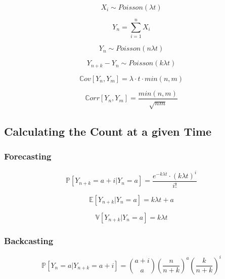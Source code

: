 \begin{equation*}
    X_i \sim Poisson(\lambda t)
\end{equation*}

\begin{equation*}
    Y_n = \sum_{i = 1}^{n} X_i
\end{equation*}

\begin{equation*}
    Y_n \sim Poisson(n \lambda t)
\end{equation*}

\begin{equation*}
    Y_{n+k} - Y_n \sim Poisson(k \lambda t)
\end{equation*}

\begin{equation*}
    \mathbb{C}ov[Y_n, Y_m] = \lambda \cdot t \cdot min(n, m)
\end{equation*}

\begin{equation*}
    \mathbb{C}orr[Y_n, Y_m] = \frac{min(n, m)}{\sqrt{nm}}
\end{equation*}

\subsection{Calculating the Count at a given Time}
\subsubsection{Forecasting}
\begin{equation*}
    \mathbb{P}[Y_{n + k} = a + i | Y_n = a] =
    \frac{
        e^{-k \lambda t} \cdot (k \lambda t)^i
    }{ i! }
\end{equation*}

\begin{equation*}
    \mathbb{E}[Y_{n + k} | Y_n = a] = k \lambda t + a
\end{equation*}

\begin{equation*}
    \mathbb{V}[Y_{n + k} | Y_n = a] = k \lambda t
\end{equation*}

\subsubsection{Backcasting}
\begin{equation*}
    \mathbb{P}[Y_n = a | Y_{n + k} = a + i ] =
    \binom{a + i}{a} 
    \left(\frac{n}{n + k}\right)^a 
    \left(\frac{k}{n + k}\right)^i
\end{equation*}


